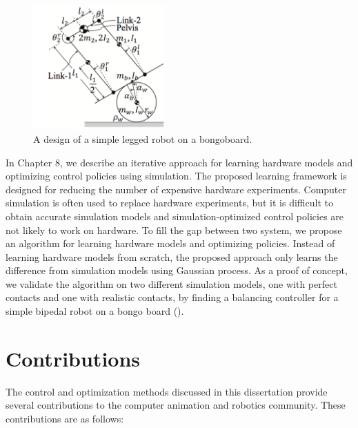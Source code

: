 \begin{figure}[0.5\textwidth]
  \begin{center}
    \includegraphics[width=0.45\textwidth]{images/intro_simple_robot.png}
  \end{center}
  \caption{A design of a simple legged robot on a bongoboard.}
  \label{fig:intro_bongo}
\end{figure}
In Chapter 8, we describe an iterative approach for learning 
hardware models and optimizing control policies using simulation.
The proposed learning framework is designed for reducing the number of
expensive hardware experiments. 
Computer simulation is often used to replace hardware experiments,
but it is difficult to obtain accurate simulation models and
simulation-optimized control policies are not likely to work on hardware.
To fill the gap between two system, we propose an algorithm for learning
hardware models and optimizing policies. 
Instead of learning hardware models from scratch, the proposed approach only
learns the difference from simulation models using Gaussian process.
As a proof of concept, we validate the algorithm on two different 
simulation models, one with perfect contacts and one with realistic contacts,
by finding a balancing controller for a simple bipedal robot on a bongo board
().

\section{Contributions}
The control and optimization methods discussed in this dissertation provide
several contributions to the computer animation and robotics community. 
These contributions are as follows:

